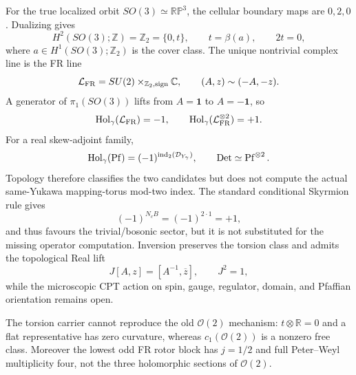 \documentclass[11pt]{article}
\numberwithin{equation}{section}
\newcommand{\CC}{\mathbb C}
\newcommand{\RR}{\mathbb R}
\newcommand{\ZZ}{\mathbb Z}
\newcommand{\cO}{\mathcal O}
\begin{document}
For the true localized orbit \(SO(3)\simeq\mathbb{RP}^3\), the cellular
boundary maps are \(0,2,0\).  Dualizing gives
\begin{equation}
 H^2(SO(3);\ZZ)=\ZZ_2=\{0,t\},\qquad t=\beta(a),\qquad 2t=0,
 \label{eq:e7-so3-cohomology}
\end{equation}
where \(a\in H^1(SO(3);\ZZ_2)\) is the cover class.  The unique nontrivial
complex line is the FR line
\begin{equation}
 {\cal L}_{\rm FR}=SU(2)\times_{\ZZ_2,\mathrm{sign}}\CC,\qquad
 (A,z)\sim(-A,-z).
 \label{eq:e7-fr-line}
\end{equation}
A generator of \(\pi_1(SO(3))\) lifts from \(A=\bm1\) to \(A=-\bm1\), so
\begin{equation}
 \operatorname{Hol}_\gamma({\cal L}_{\rm FR})=-1,\qquad
 \operatorname{Hol}_\gamma({\cal L}_{\rm FR}^{\otimes2})=+1.
 \label{eq:e7-fr-holonomy}
\end{equation}
For a real skew-adjoint family,
\begin{equation}
 \operatorname{Hol}_\gamma(\operatorname{Pf})
 =(-1)^{\operatorname{ind}_2({\cal D}_{Y_\gamma})},\qquad
 \operatorname{Det}\simeq\operatorname{Pf}^{\otimes2}.
 \label{eq:e7-pfaffian-line}
\end{equation}
Topology therefore classifies the two candidates but does not compute the
actual same-Yukawa mapping-torus mod-two index.  The standard conditional
Skyrmion rule gives
\begin{equation}
 (-1)^{N_cB}=(-1)^{2\cdot1}=+1,
 \label{eq:e7-fr-two-colour}
\end{equation}
and thus favours the trivial/bosonic sector, but it is not substituted for
the missing operator computation.  Inversion preserves the torsion class and
admits the topological Real lift
\begin{equation}
 J[A,z]=[A^{-1},\overline z],\qquad J^2=1,
 \label{eq:e7-fr-real-lift}
\end{equation}
while the microscopic CPT action on spin, gauge, regulator, domain, and
Pfaffian orientation remains open.

The torsion carrier cannot reproduce the old \(\cO(2)\) mechanism:
\(t\otimes\RR=0\) and a flat representative has zero curvature, whereas
\(c_1(\cO(2))\) is a nonzero free class.  Moreover the lowest odd FR rotor
block has \(j=1/2\) and full Peter--Weyl multiplicity four, not the three
holomorphic sections of \(\cO(2)\).
\end{document}
